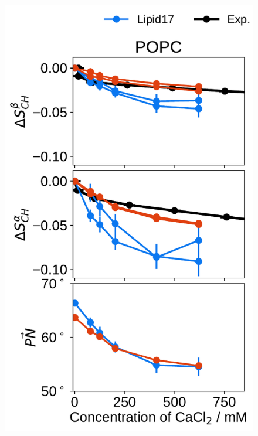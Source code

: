 \documentclass[journal=jpcbfk,manuscript=article]{achemso}
\newlength{\figheight}
\begin{document}

\begin{figure}[tbp!] 
  \centering 
  \includegraphics[height=\figheight]{../img/ecc_pops/order_parameters_changes_ecc-lip_L14_A-B-PN-COO_POPC_cacl.pdf} 

\end{figure}
\end{document}
